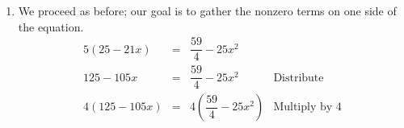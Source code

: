 \documentclass{ximera}
\begin{document}
{{{{{\begin{example}
\begin{enumerate}
\[\begin{array}{rclr}
(y-1)^2 & = &  2 - \dfrac{y+2}{3} & \\ [8pt]

y^2 - 2y + 1 & = & 2 - \dfrac{y+2}{3} & \text{Perfect Square Trinomial}\\ [8pt]

3(y^2 - 2y + 1) & = & 3\left(2 - \dfrac{y+2}{3} \right) & \text{Multiply by $3$} \\ [10pt]
3y^2 - 6y + 3 & = & 6 - 3\left(\dfrac{y+2}{3}\right) & \text{Distribute} \\ [8pt]

3y^2 - 6y + 3 & = & 6 - (y+2) & \\

3y^2 - 6y + 3 - 6 + (y+2) & = & 0 & \text{Subtract $6$, Add $(y+2)$}\\

3y^2 - 5y - 1 & = & 0 & \\

\end{array}\]

A cursory attempt at factoring bears no fruit, so we run this through the Quadratic Formula with $a = 3$, $b = -5$ and $c = -1$. \[ \begin{array}{rclr}

y & = & \dfrac{-(-5) \pm \sqrt{(-5)^2 - 4(3)(-1)}}{2(3)} & \\ [8pt]

y & = & \dfrac{5 \pm \sqrt{25 + 12}}{6} & \\[8pt]

y & = & \dfrac{5 \pm \sqrt{37}}{6} & \\

\end{array} \] Since $37$ is prime, we have no way to reduce $\sqrt{37}$.  Thus, our final answers are $y = \frac{5 \pm \sqrt{37}}{6}$. The reader is encouraged to supply the details of the challenging verification of the answers.

\item  We proceed as before; our goal is to gather the nonzero terms on one side of the equation. \[ \begin{array}{rclr}

5(25 - 21x) & = &  \dfrac{59}{4} - 25x^2 & \\ [10pt]

125 - 105x & = & \dfrac{59}{4} - 25x^2 & \text{Distribute} \\ [10pt]

4(125 - 105x) & = & 4\left(\dfrac{59}{4} - 25x^2 \right) & \text{Multiply by $4$} \\ [10pt]


\end{array}\]
\end{enumerate}
\end{example}}}}}}
\end{document}
